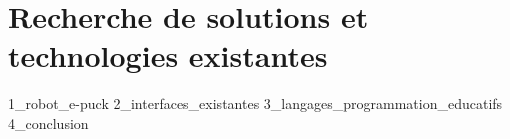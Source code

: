 \section{Recherche de solutions et technologies existantes}

{1_robot_e-puck}
{2_interfaces_existantes}
{3_langages_programmation_educatifs}
{4_conclusion}